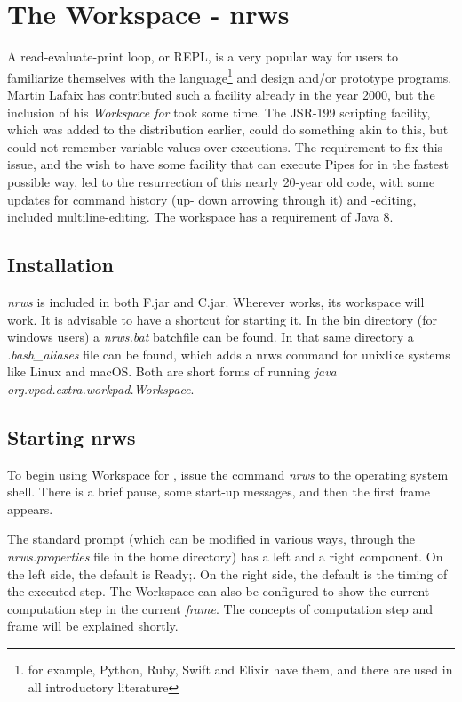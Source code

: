\chapter{The \nr{} Workspace - nrws}
A read-evaluate-print  loop, or REPL, is a very popular way for users to familiarize themselves with the language\footnote{for example, Python, Ruby, Swift and Elixir have them, and there are used in all introductory literature} and design and/or prototype programs. Martin Lafaix has contributed such a facility already in the year 2000, but the inclusion of his \emph{Workspace for \nr{}} took some time. The JSR-199 scripting facility, which was added to the distribution earlier, could do something akin to this, but could not remember variable values over executions. The requirement to fix this issue, and the wish to have some facility that can execute Pipes for \nr{} in the fastest possible way, led to the resurrection of this nearly 20-year old code, with some updates for command history (up- down arrowing through it) and -editing, included multiline-editing. The \nr{} workspace has a requirement of Java 8.

 \section{Installation}
 \emph{nrws} is included in both \nr{}F.jar and \nr{}C.jar. Wherever \nr{} works, its workspace will work.
 It is advisable to have a shortcut for starting it. In the bin directory (for windows users) a \emph{nrws.bat} batchfile can be found. In that same directory a \emph{.bash\_aliases} file can be found, which adds a nrws command for unixlike systems like Linux and macOS. Both are short forms of running \emph{java org.vpad.extra.workpad.Workspace}.

\section{Starting nrws}

To begin using Workspace for \nr{}, issue the command \emph{nrws} to the operating system shell. There is a brief pause, some start-up messages, and then the first frame appears.

The standard prompt (which can be modified in various ways, through
the \emph{nrws.properties} file in the home directory) has a left and
a right component. On the left side, the default is Ready;. On the
right side, the default is the timing of the executed step. The
Workspace can also be configured to show the current computation step in the current \emph{frame}. The concepts of computation step and frame will be explained shortly.

